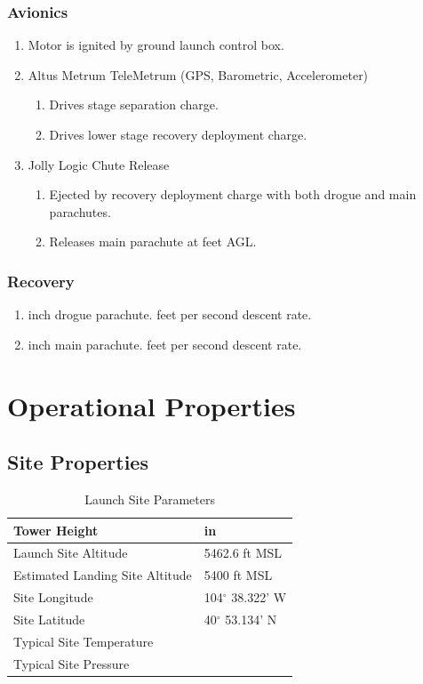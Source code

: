 \documentclass[12pt]{article}
\newcommand{\ph}{\framebox[48pt]{\rule{0pt}{12pt}}}
\begin{document}
\subsubsection{Avionics}
\begin{enumerate}[label=(\alph*)]
    \item Motor is ignited by ground launch control box.
    \item Altus Metrum TeleMetrum (GPS, Barometric, Accelerometer)
    \begin{enumerate}[label=(\arabic*)]
        \item Drives stage separation charge.
        \item Drives lower stage recovery deployment charge.
    \end{enumerate}
    \item Jolly Logic Chute Release
    \begin{enumerate}[label=(\arabic*)]
        \item Ejected by recovery deployment charge with both drogue and main parachutes.
        \item Releases main parachute at \ph feet AGL.
    \end{enumerate}
\end{enumerate}
\subsubsection{Recovery}
\begin{enumerate}[label=(\alph*)]
    \item \ph inch drogue parachute. \ph feet per second descent rate.
    \item \ph inch main parachute. \ph feet per second descent rate.
\end{enumerate}
\section{Operational Properties}
\subsection{Site Properties}
\begin{table}[H]
    \centering
    \caption{Launch Site Parameters}
    \begin{tabular}{|l|l|}
        \hline
        Tower Height & \ph in \\ \hline
        Launch Site Altitude & 5462.6 ft MSL \\ \hline
        Estimated Landing Site Altitude & 5400 ft MSL \\ \hline
        Site Longitude & 104$^\circ$ 38.322' W \\ \hline
        Site Latitude & 40$^\circ$ 53.134' N \\ \hline
        Typical Site Temperature & \ph \\ \hline
        Typical Site Pressure & \ph \\ \hline
    \end{tabular}
\end{table}
\end{document}
